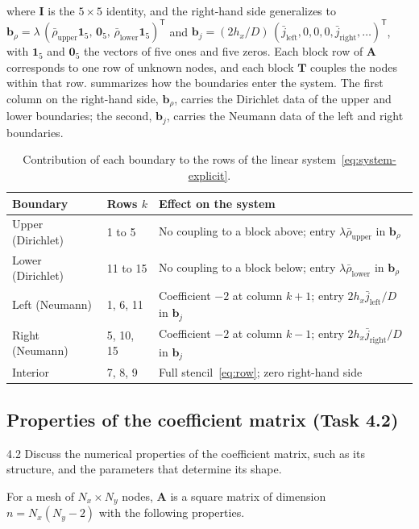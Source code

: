 \documentclass[11pt,a4paper]{article}
\numberwithin{equation}{section}
\theoremstyle{definition}
\theoremstyle{remark}
\newcommand{\bA}{\mathbf{A}}
\newcommand{\bT}{\mathbf{T}}
\newcommand{\bI}{\mathbf{I}}
\newcommand{\bb}{\bm{b}}
\newcommand{\rhoUpper}{\bar{\rho}_{\mathrm{upper}}}
\newcommand{\rhoLower}{\bar{\rho}_{\mathrm{lower}}}
\newcommand{\jleft}{\bar{j}_{\mathrm{left}}}
\newcommand{\jright}{\bar{j}_{\mathrm{right}}}
\begin{document}
where $\bI$ is the $5 \times 5$ identity, and the right-hand side generalizes to
$\bb_\rho = \lambda\,(\rhoUpper\bm{1}_5,\, \bm{0}_5,\, \rhoLower\bm{1}_5)^{\mathsf{T}}$ and
$\bb_j = (2h_x/D)\,(\jleft, 0, 0, 0, \jright, \dots)^{\mathsf{T}}$, with $\bm{1}_5$ and
$\bm{0}_5$ the vectors of five ones and five zeros. Each block row of $\bA$ corresponds to
one row of unknown nodes, and each block $\bT$ couples the nodes within that row.
 summarizes how the boundaries enter the system. The first column on the
right-hand side, $\bb_\rho$, carries the Dirichlet data of the upper and lower boundaries;
the second, $\bb_j$, carries the Neumann data of the left and right boundaries.

\begin{table}[ht]
  \centering
  \caption{Contribution of each boundary to the rows of the linear
    system~\eqref{eq:system-explicit}.}
  \label{tab:rows}
  \begin{tabularx}{\linewidth}{llX}
    \toprule
    Boundary & Rows $k$ & Effect on the system \\
    \midrule
    Upper (Dirichlet) & 1 to 5 & No coupling to a block above; entry $\lambda\rhoUpper$ in $\bb_\rho$ \\
    Lower (Dirichlet) & 11 to 15 & No coupling to a block below; entry $\lambda\rhoLower$ in $\bb_\rho$ \\
    Left (Neumann) & 1, 6, 11 & Coefficient $-2$ at column $k + 1$; entry $2h_x\jleft/D$ in $\bb_j$ \\
    Right (Neumann) & 5, 10, 15 & Coefficient $-2$ at column $k - 1$; entry $2h_x\jright/D$ in $\bb_j$ \\
    Interior & 7, 8, 9 & Full stencil~\eqref{eq:row}; zero right-hand side \\
    \bottomrule
  \end{tabularx}
\end{table}

\subsection{Properties of the coefficient matrix (Task 4.2)}\label{sec:properties}

\begin{task}{4.2}
  Discuss the numerical properties of the coefficient matrix, such as its structure, and
  the parameters that determine its shape.
\end{task}

For a mesh of $N_x \times N_y$ nodes, $\bA$ is a square matrix of dimension
$n = N_x(N_y - 2)$ with the following properties.
\end{document}
